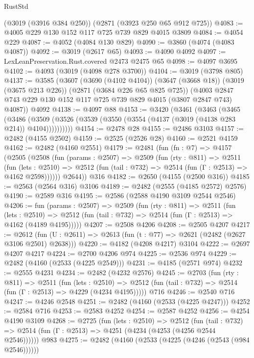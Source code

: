 \begin{lexlean}{RustStd}
\begin{coremodule}
    (@3019 (@3916 @384 @250))
    (@2871 (@3923 @250 @65 @912 @725))
@4083 := @4005 @229 @130 @152 @117 @725 @739 @829 @4015 @3809
@4084 := @4054 @229
@4087 := @4052 (@4084 @130 @829)
@4090 := @3860 (@4074 (@4083 @4087))
@4092 := @3019 (@2617 @65)
@4093 := @4090 @4092
@4097 := LexLeanPreservation.Rust.covered @2473 @2475 @65
@4098 := @4097 @3695
@4102 := @4093 (@3019 (@4098 @278 @3700))
@4104 := @3019 (@3798 @805)
@4137 := @3585
    (@3607
      (@3690 (@4102 @4104))
      (@3647 (@3668 @18))
      (@3019 (@3675 @213 @226))
      (@2871 (@3684 @226 @65 @825 @725))
      (@4003 @2847 @743 @229 @130 @152 @117 @725 @739 @829 @4015 (@3807 @2847 @743) @4087))
    @4092
@4138 := @4097 @88
@4153 := @3420
    (@3461
      (@3463
        (@3465
          (@3486 (@3509 (@3526 (@3539 (@3550 (@3554 (@4137 (@3019 (@4138 @283 @214)) @4104))))))))))
@4154 := @2478 @28
@4155 := @2486 @3103
@4157 := @2482 (@4155 @2502)
@4159 := @2525 (@2526 @28)
@4160 := @2521 @4159
@4162 := @2482 (@4160 @2551)
@4179 := @2481
    (fun (fn : @7) =>
    @4157
      (@2505
        (@2508
          (fun (params : @2507) =>
          @2509
            (fun (rty : @811) =>
            @2511
              (fun (lets : @2510) =>
              @2512 (fun (tail : @732) => @2514 (fun (Γ : @2513) => @4162 @2598))))))
        @2644))
    @316
@4182 := @2650 (@4155 (@2500 @316))
@4185 := @2563 (@2564 @316) @3106
@4189 := @2482 (@2555 (@4185 @2572) @2576)
@4190 := @2589 @316
@4195 := @2586 (@2588 @4190 @3109 @2544 @2546)
@4206 := fun (params : @2507) =>
  @2509
    (fun (rty : @811) =>
    @2511
      (fun (lets : @2510) =>
      @2512 (fun (tail : @732) => @2514 (fun (Γ : @2513) => @4162 (@4189 @4195)))))
@4207 := @2508 @4206
@4208 := @2505 @4207
@4217 := @2612 (fun (U : @2611) => @2613 (fun (t : @77) => @2621 (@2482 (@2627 @3106 @2501) @2638)))
@4220 := @4182 (@4208 @4217) @3104
@4222 := @2697 @4207 @4217
@4224 := @2700 @4206 @974
@4225 := @2536 @974
@4229 := @2482 (@4160 (@2533 (@4225 @2549)))
@4231 := @4185 (@2571 @974)
@4232 := @2555 @4231
@4234 := @2482 (@4232 @2576)
@4245 := @2703
    (fun (rty : @811) =>
    @2511
      (fun (lets : @2510) =>
      @2512 (fun (tail : @732) => @2514 (fun (Γ : @2513) => @4229 (@4234 @4195)))))
    @716
@4246 := @2540 @716
@4247 := @4246 @2548
@4251 := @2482 (@4160 (@2533 (@4225 @4247)))
@4252 := @2584 @716
@4253 := @2583 @4252
@4254 := @2587 @4252
@4256 := @4254 @4190 @3109
@4268 := @2725
    (fun (lets : @2510) =>
    @2512
      (fun (tail : @732) => @2514 (fun (Γ : @2513) => @4251 (@4234 (@4253 (@4256 @2544 @2546))))))
    @983
@4275 := @2482 (@4160 (@2533 (@4225 (@4246 (@2543 (@984 @2546))))))

\end{coremodule}
\end{lexlean}
